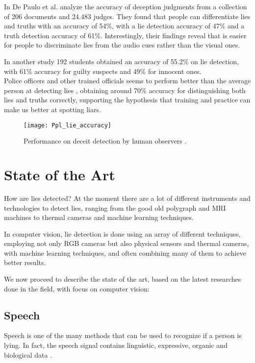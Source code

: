 In \cite{BondDePauloAccuracy} De Paulo et al. analyze the accuracy of deception judgments from a collection of 206 documents and 24.483 judges. They found that people can differentiate lies and truths with an accuracy of 54\%, with a lie detection accuracy of 47\% and a truth detection accuracy of 61\%. Interestingly, their findings reveal that is easier for people to discriminate lies from the audio cues rather than the visual ones.

In another study \cite{HartwigGranhag} 192 students obtained an accuracy of 55.2\% on lie detection, with 61\% accuracy for guilty suspects and 49\% for innocent ones.\\
Police officers and other trained officials seems to perform better than the average person at detecting lies  \cite{VrijPoliceDetect}, obtaining around 70\% accuracy for distinguishing both lies and truths correctly, supporting the hypothesis that training and practice can make us better at spotting liars.

\begin{figure}[H]
	\centering
	\texttt{[image: Ppl\_lie\_accuracy]}
	\caption{Performance on deceit detection by human observers \cite{SU201652}.}
\end{figure}
 
\pagebreak

\section{State of the Art} \label{sota}
How are lies detected? At the moment there are a lot of different instruments and technologies to detect lies, ranging from the good old polygraph and MRI machines to thermal cameras and machine learning techniques.

In computer vision, lie detection is done using an array of different techniques, employing not only RGB cameras but also physical sensors and thermal cameras, with machine learning techniques, and often combining many of them to achieve better results.

We now proceed to describe the state of the art, based on the latest researches done in the field, with focus on computer vision:

\subsection*{Speech}
Speech is one of the many methods that can be used to recognize if a person is lying. In fact, the speech signal contains linguistic, expressive, organic and biological data \cite{norena}.

